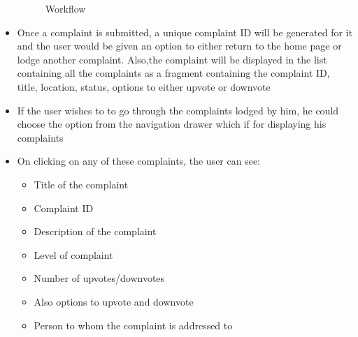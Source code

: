 \documentclass[12pt]{article}
\begin{document}
\begin{itemize}
\begin{figure}[ht!]
\caption{Workflow \label{overflow}}
\end{figure}
\item Once a complaint is submitted, a unique complaint ID will be generated for it and the user would be given an option to either return to the home page or lodge another complaint. Also,the complaint will be displayed in the list containing all the complaints as a fragment containing the complaint ID, title, location, status, options to either upvote or downvote
\item If the user wishes to to go through the complaints lodged by him, he could choose the option from the navigation drawer which if for displaying his complaints
\item On clicking on any of these complaints, the user can see:
	\begin{itemize}
		\color{blue}
		\item Title of the complaint 
		\item Complaint ID
		\item Description of the complaint
		\item Level of complaint
		\item Number of upvotes/downvotes
		\item Also options to upvote and downvote
		\item Person to whom the complaint is addressed to
	\end{itemize}
\end{itemize}
\end{document}
